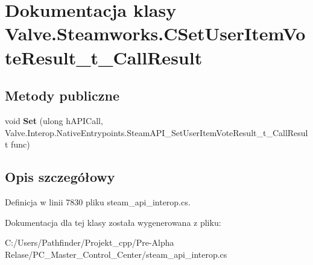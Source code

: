 \hypertarget{class_valve_1_1_steamworks_1_1_c_set_user_item_vote_result__t___call_result}{}\section{Dokumentacja klasy Valve.\+Steamworks.\+C\+Set\+User\+Item\+Vote\+Result\+\_\+t\+\_\+\+Call\+Result}
\label{class_valve_1_1_steamworks_1_1_c_set_user_item_vote_result__t___call_result}
\subsection*{Metody publiczne}
\begin{DoxyCompactItemize}
\item 
\mbox{\label{class_valve_1_1_steamworks_1_1_c_set_user_item_vote_result__t___call_result_a94e8f782ac8c40b76f55ab09d4afe2bd}} 
void {\bfseries Set} (ulong h\+A\+P\+I\+Call, Valve.\+Interop.\+Native\+Entrypoints.\+Steam\+A\+P\+I\+\_\+\+Set\+User\+Item\+Vote\+Result\+\_\+t\+\_\+\+Call\+Result func)
\end{DoxyCompactItemize}


\subsection{Opis szczegółowy}


Definicja w linii 7830 pliku steam\+\_\+api\+\_\+interop.\+cs.



Dokumentacja dla tej klasy została wygenerowana z pliku\+:\begin{DoxyCompactItemize}
\item 
C\+:/\+Users/\+Pathfinder/\+Projekt\+\_\+cpp/\+Pre-\/\+Alpha Relase/\+P\+C\+\_\+\+Master\+\_\+\+Control\+\_\+\+Center/steam\+\_\+api\+\_\+interop.\+cs\end{DoxyCompactItemize}

